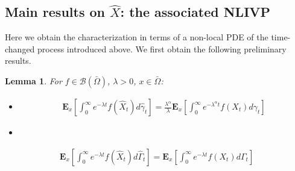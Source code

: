 \documentclass[11pt,a4paper]{article}
\newtheorem{lemma}{Lemma}
\begin{document}
\subsection{Main results on $\hat{X}$: the associated NLIVP}
\label{Sec:MainXhat}

Here we obtain the characterization in terms of a non-local PDE of the time-changed process introduced above. We first obtain the following preliminary results.
\begin{lemma}
\label{lemmaequivPCAFhatNOhat}
For $f \in \mathcal{B}(\bar{\Omega})$, $\lambda>0$, $x \in \bar{\Omega}$:
\begin{itemize}
\item[i)]
\begin{align*}
\mathbf{E}_x\left[\int_0^\infty e^{-\lambda t} f(\hat{X}_t) d\hat{\gamma}_t \right] = \frac{\lambda^\alpha}{\lambda} \mathbf{E}_x \left[\int_0^\infty e^{-\lambda^\alpha t} f(X_t) d\gamma_t \right]
\end{align*}
\item[ii)]
\end{itemize} 
\begin{align*}
\mathbf{E}_x\left[\int_0^\infty e^{-\lambda t} f(\hat{X}_t) d\hat{\Gamma}_t \right] = \mathbf{E}_x \left[\int_0^\infty e^{-\lambda t} f(X_t) d\Gamma_t \right]
\end{align*}
\end{lemma}
\end{document}
